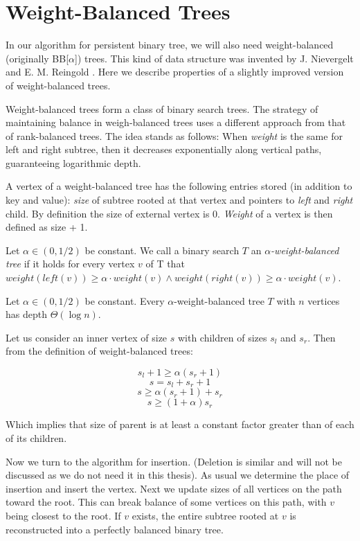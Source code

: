 \section{Weight-Balanced Trees}

In our algorithm for persistent binary tree, we will also need weight-balanced (originally BB[$\alpha$]) trees. This kind of data structure was invented by J. Nievergelt and E. M. Reingold \cite{weight-balanced}. Here we describe properties of a slightly improved version of weight-balanced trees.

Weight-balanced trees form a class of binary search trees. The strategy of maintaining balance in weigh-balanced trees uses a different approach from that of rank-balanced trees. The idea stands as follows: When \emph{weight} is the same for left and right subtree, then it decreases exponentially along vertical paths, guaranteeing logarithmic depth.

A vertex of a weight-balanced tree has the following entries stored (in addition to key and value): {\em size} of subtree rooted at that vertex and pointers to {\em left} and {\em right} child. By definition the size of external vertex is 0. {\em Weight} of a vertex is then defined as size + 1.

\begin{defn}
Let $\alpha \in (0,1/2)$ be constant. We call a binary search $T$ an {\em $\alpha$-weight-balanced tree} if it holds for every vertex $v$ of T that $weight(left(v)) \geq \alpha \cdot weight(v) \wedge weight(right(v)) \geq \alpha \cdot weight(v) $.
\end{defn}

\begin{prop}
Let $\alpha \in (0,1/2)$ be constant. Every $\alpha$-weight-balanced tree $T$ with $n$ vertices has depth $\Theta(\log n)$. 
\end{prop}

\begin{myproof}
Let us consider an inner vertex of size $s$ with children of sizes $s_l$ and $s_r$. Then from the definition of weight-balanced trees:

$$s_l + 1 \geq \alpha (s_r+1)$$
$$ s = s_l + s_r + 1 $$
$$ s \geq \alpha (s_r+1) + s_r $$
$$ s \geq (1+\alpha)s_r $$

Which implies that size of parent is at least a constant factor greater than of each of its children.
\end{myproof}

Now we turn to the algorithm for insertion. (Deletion is similar and will not be discussed as we do not need it in this thesis). As usual we determine the place of insertion and insert the vertex. Next we update sizes of all vertices on the path toward the root. This can break balance of some vertices on this path, with $v$ being closest to the root. If $v$ exists, the entire subtree rooted at $v$ is reconstructed into a perfectly balanced binary tree.


